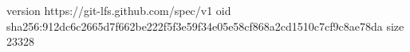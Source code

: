 version https://git-lfs.github.com/spec/v1
oid sha256:912dc6c2665d7f662be222f5f3e59f34e05e58cf868a2cd1510c7cf9c8ae78da
size 23328
